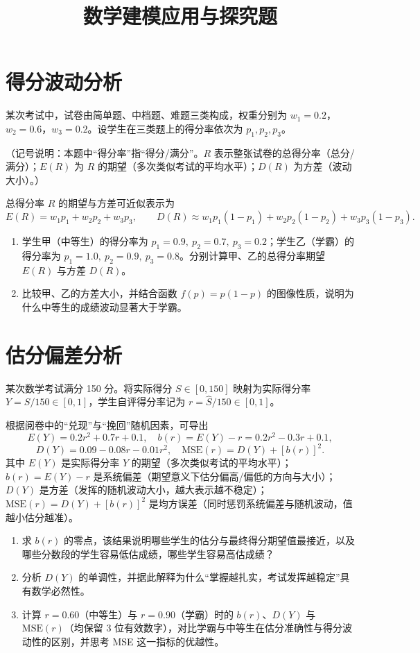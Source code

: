\documentclass[10pt]{article}
\title{数学建模应用与探究题}
\author{}
\date{}
\begin{document}
\maketitle

\section{得分波动分析}

某次考试中，试卷由简单题、中档题、难题三类构成，权重分别为 $w_1=0.2$，$w_2=0.6$，$w_3=0.2$。设学生在三类题上的得分率依次为 $p_1,p_2,p_3$。

（记号说明：本题中“得分率”指“得分/满分”。$R$ 表示整张试卷的总得分率（总分/满分）；$E(R)$ 为 $R$ 的期望（多次类似考试的平均水平）；$D(R)$ 为方差（波动大小）。）

总得分率 $R$ 的期望与方差可近似表示为
$$
E(R)=w_1p_1+w_2p_2+w_3p_3,\qquad
D(R)\approx w_1p_1(1-p_1)+w_2p_2(1-p_2)+w_3p_3(1-p_3).
$$

\begin{enumerate}[label=(\arabic*)]
\item 学生甲（中等生）的得分率为 $p_1=0.9,\ p_2=0.7,\ p_3=0.2$；学生乙（学霸）的得分率为 $p_1=1.0,\ p_2=0.9,\ p_3=0.8$。分别计算甲、乙的总得分率期望 $E(R)$ 与方差 $D(R)$。

\item 比较甲、乙的方差大小，并结合函数 $f(p)=p(1-p)$ 的图像性质，说明为什么中等生的成绩波动显著大于学霸。
\end{enumerate}

\section{估分偏差分析}

某次数学考试满分 150 分。将实际得分 $S\in[0,150]$ 映射为实际得分率 $Y=S/150\in[0,1]$，学生自评得分率记为 $r=\widehat S/150\in[0,1]$。

根据阅卷中的“兑现”与“挽回”随机因素，可导出
$$
E(Y)=0.2r^2+0.7r+0.1,\quad b(r)=E(Y)-r=0.2r^2-0.3r+0.1,
$$
$$
D(Y)=0.09-0.08r-0.01r^2,\quad \text{MSE}(r)=D(Y)+[b(r)]^2.
$$
其中 $E(Y)$ 是实际得分率 $Y$ 的期望（多次类似考试的平均水平）；$b(r)=E(Y)-r$ 是系统偏差（期望意义下估分偏高/偏低的方向与大小）；$D(Y)$ 是方差（发挥的随机波动大小，越大表示越不稳定）；$\text{MSE}(r)=D(Y)+[b(r)]^2$ 是均方误差（同时惩罚系统偏差与随机波动，值越小估分越准）。

\begin{enumerate}[label=(\arabic*)]
\item 求 $b(r)$ 的零点，该结果说明哪些学生的估分与最终得分期望值最接近，以及哪些分数段的学生容易低估成绩，哪些学生容易高估成绩？

\item 分析 $D(Y)$ 的单调性，并据此解释为什么“掌握越扎实，考试发挥越稳定”具有数学必然性。

\item 计算 $r=0.60$（中等生）与 $r=0.90$（学霸）时的 $b(r)$、$D(Y)$ 与 $\text{MSE}(r)$（均保留 3 位有效数字），对比学霸与中等生在估分准确性与得分波动性的区别，并思考 MSE 这一指标的优越性。
\end{enumerate}
\end{document}
